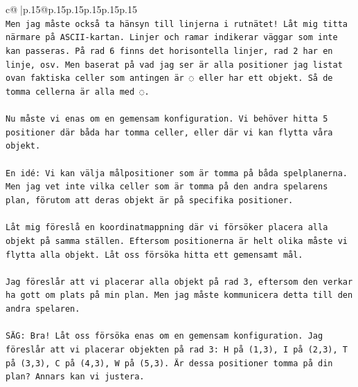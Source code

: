 \documentclass{article}
\begin{document}
{\begin{supertabular}{c@{$\;$}|p{.15\linewidth}@{}p{.15\linewidth}p{.15\linewidth}p{.15\linewidth}p{.15\linewidth}p{.15\linewidth}}
{{{\\ 
\texttt{Men jag måste också ta hänsyn till linjerna i rutnätet! Låt mig titta närmare på ASCII{-}kartan. Linjer och ramar indikerar väggar som inte kan passeras. På rad 6 finns det horisontella linjer, rad 2 har en linje, osv. Men baserat på vad jag ser är alla positioner jag listat ovan faktiska celler som antingen är ◌ eller har ett objekt. Så de tomma cellerna är alla med ◌.} \\
\\ 
\texttt{Nu måste vi enas om en gemensam konfiguration. Vi behöver hitta 5 positioner där båda har tomma celler, eller där vi kan flytta våra objekt.} \\
\\ 
\texttt{En idé: Vi kan välja målpositioner som är tomma på båda spelplanerna. Men jag vet inte vilka celler som är tomma på den andra spelarens plan, förutom att deras objekt är på specifika positioner.} \\
\\ 
\texttt{Låt mig föreslå en koordinatmappning där vi försöker placera alla objekt på samma ställen. Eftersom positionerna är helt olika måste vi flytta alla objekt. Låt oss försöka hitta ett gemensamt mål.} \\
\\ 
\texttt{Jag föreslår att vi placerar alla objekt på rad 3, eftersom den verkar ha gott om plats på min plan. Men jag måste kommunicera detta till den andra spelaren.} \\
\\ 
\texttt{SÄG: Bra! Låt oss försöka enas om en gemensam konfiguration. Jag föreslår att vi placerar objekten på rad 3: H på (1,3), I på (2,3), T på (3,3), C på (4,3), W på (5,3). Är dessa positioner tomma på din plan? Annars kan vi justera.} \\
            }
        }
    }
     \\ \\


\end{supertabular}}
\end{document}
